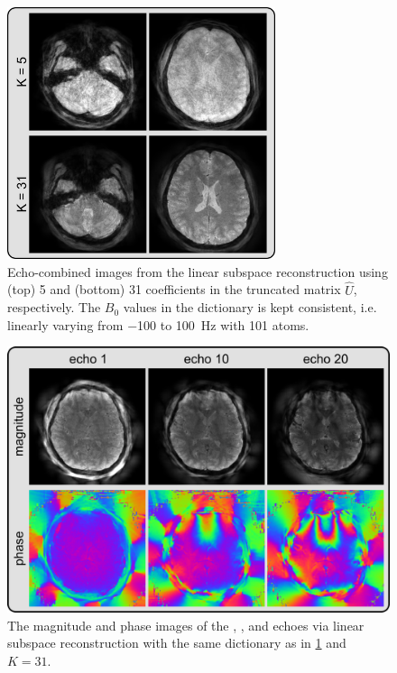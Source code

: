 \documentclass[a4paper,11pt]{article}
\def\InternRev{}
\begin{document}
\ifdefined\InternRev
\pagebreak
\fi

\begin{figure}[H]
	\centering
	\ifdefined\InternRev
	\includegraphics[width=0.7\textwidth]{../figures/fig4.png}
	\fi
	\caption{Echo-combined images from the linear subspace reconstruction 
		using (top) 5 and (bottom) 31 coefficients 
		in the truncated matrix $\hat{U}$, respectively. 
		The $B_0$ values in the dictionary is kept consistent, 
		i.e. linearly varying from \num{-100} to \SI{100}{\Hz} with \num{101} atoms.}
	\label{FIG:BasisSize}
\end{figure}

\ifdefined\InternRev
\pagebreak
\fi

\begin{figure}[H]
	\centering
	\ifdefined\InternRev
	\includegraphics[width=\textwidth]{../figures/fig5.png}
	\fi
	\caption{The magnitude and phase images 
		of the , , and  echoes 
		via linear subspace reconstruction with 
		the same dictionary as in \cref{FIG:BasisSize} and $K = 31$.}
	\label{FIG:Echoes}
\end{figure}
\end{document}
